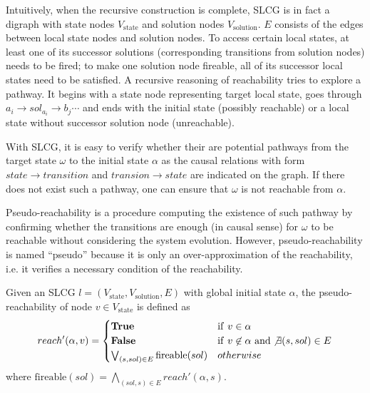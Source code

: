 Intuitively, when the recursive construction is complete, SLCG is in fact a digraph with state nodes $V_{\mathrm{state}}$ and solution nodes $V_{\mathrm{solution}}$. 
$E$ consists of the edges between local state nodes and solution nodes. 
To access certain local states, at least one of its successor solutions (corresponding transitions from solution nodes) needs to be fired; to make one solution node fireable, all of its successor local states need to be satisfied. 
A recursive reasoning of reachability tries to explore a pathway.
It begins with a state node representing target local state, goes through $a_i\to sol_{a_i}\to b_j \cdots$ and ends with the initial state (possibly reachable) or a local state without successor solution node (unreachable). 

With SLCG, it is easy to verify whether their are potential pathways from the target state $\omega$ to the initial state $\alpha$ as the causal relations with form $state\to transition$ and $transion\to state$ are indicated on the graph.
If there does not exist such a pathway, one can ensure that $\omega$ is not reachable from $\alpha$.

Pseudo-reachability is a procedure computing the existence of such pathway by confirming whether the transitions are enough (in causal sense) for $\omega$ to be reachable without considering the system evolution.
However, pseudo-reachability is named ``pseudo'' because it is only an over-approximation of the reachability, i.e. it verifies a necessary condition of the reachability.

\begin{definition}\label{defPseudoReach}
Given an SLCG $l=(V_{\mathrm{state}},V_{\mathrm{solution}},E)$ with global initial state $\alpha$, the pseudo-reachability of node $v\in V_{\mathrm{state}}$ is defined as
\begin{equation}
\nonumber
    reach'(\alpha,v)=
    \begin{cases}
        \mathrm{\bf True} & {\rm if\ } v\in \alpha\\
        \mathrm{\bf False} & {\rm if\ } v\not\in \alpha\ {\rm and} \not\exists(s,sol) \in E\\
        \bigvee_{(s,sol) \in E} \mathrm{fireable}(sol) & otherwise
    \end{cases}
\end{equation}
where $\mathrm{fireable}(sol)=\bigwedge_{(sol,s)\in E} reach'(\alpha,s)$. 

\end{definition}

